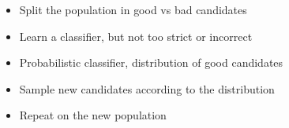 \documentclass{beamer}
\begin{document}
{\begin{columns}
    
  \end{columns}

  \begin{itemize}
  \item<2-> Split the population in \alert{good vs bad candidates}
  \item<3-> \alert{Learn a classifier}, but not too strict or incorrect
  \item<4-> Probabilistic classifier,
    \alert{distribution of good candidates}
  \item<5-> \alert{Sample new candidates} according to the distribution
  \item<6-> Repeat on the new population
  \end{itemize}

}
\end{document}
